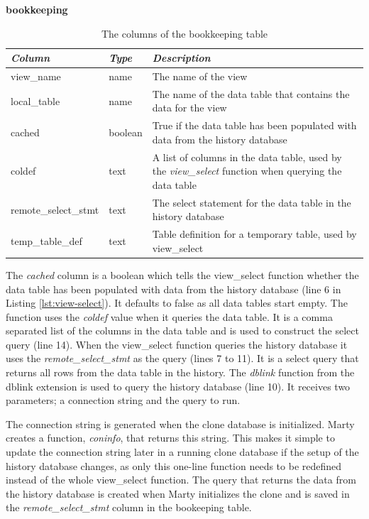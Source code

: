 \begin{table}[h]
  \centering
  \textbf{bookkeeping}
  \begin{tabularx}{\textwidth}{llX}
    \textit{Column} & \textit{Type} & \textit{Description} \\
    \midrule
    view\_name & name & The name of the view \\
    local\_table & name & The name of the data table that contains the data for the view \\
    cached & boolean & True if the data table has been populated with data from the history database \\
    coldef & text & A list of columns in the data table, used by the \textit{view\_select} function when querying the data table \\
    remote\_select\_stmt & text & The select statement for the data table in the history database \\
    temp\_table\_def & text & Table definition for a temporary table, used by view\_select \\
  \end{tabularx}
  \caption{The columns of the bookkeeping table}
  \label{tbl:bookkeeping}
\end{table}

The \textit{cached} column is a boolean which tells the view\_select function whether the data table has been populated with data from the history database (line 6 in Listing \ref{lst:view-select}).
It defaults to false as all data tables start empty.
The function uses the \textit{coldef} value when it queries the data table.
It is a comma separated list of the columns in the data table and is used to construct the select query (line 14).
When the view\_select function queries the history database it uses the \textit{remote\_select\_stmt} as the query (lines 7 to 11).
It is a select query that returns all rows from the data table in the history.
The \textit{dblink} function from the dblink extension is used to query the history database (line 10).
It receives two parameters; a connection string and the query to run.

The connection string is generated when the clone database is initialized.
Marty creates a function, \textit{coninfo}, that returns this string.
This makes it simple to update the connection string later in a running clone database if the setup of the history database changes, as only this one-line function needs to be redefined instead of the whole view\_select function.
The query that returns the data from the history database is created when Marty initializes the clone and is saved in the \textit{remote\_select\_stmt} column in the bookeeping table.



